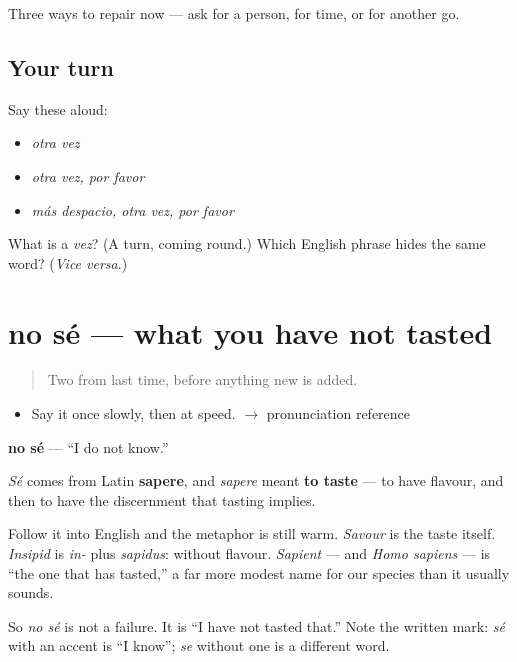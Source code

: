 \begin{grammarlens}[title={What you've built}]
Three ways to repair now — ask for a person, for time, or for another go.
\end{grammarlens}

\subsection*{Your turn}
Say these aloud:

\begin{itemize}
\raggedright
  \item \emph{otra vez}
  \item \emph{otra vez, por favor}
  \item \emph{más despacio, otra vez, por favor}
\end{itemize}

\begin{tcolorbox}[breakable,colback=teal!4,colframe=teal!35!black,title={Before you move on}]
What is a \emph{vez}? (A turn, coming round.) Which English phrase hides the same word? (\emph{Vice versa}.)
\end{tcolorbox}
\section[no sé]{no sé — what you have not tasted}

\label{lesson:ES-C303-no-se}



\begin{quote}
Two from last time, before anything new is added.
\end{quote}

\begin{sounds}
\begin{itemize}
\raggedright
  \item Say it once slowly, then at speed. $\to$ pronunciation reference
\end{itemize}
\end{sounds}

\begin{cousinweb}
\textbf{no sé} — \textquotedblleft{}I do not know.\textquotedblright{}

\emph{Sé} comes from Latin \textbf{sapere}, and \emph{sapere} meant \textbf{to taste} — to have flavour, and then to have the discernment that tasting implies.

Follow it into English and the metaphor is still warm. \emph{Savour} is the taste itself. \emph{Insipid} is \emph{in-} plus \emph{sapidus}: without flavour. \emph{Sapient} — and \emph{Homo sapiens} — is \textquotedblleft{}the one that has tasted,\textquotedblright{} a far more modest name for our species than it usually sounds.

So \emph{no sé} is not a failure. It is \textquotedblleft{}I have not tasted that.\textquotedblright{} Note the written mark: \emph{sé} with an accent is \textquotedblleft{}I know\textquotedblright{}; \emph{se} without one is a different word.
\end{cousinweb}

